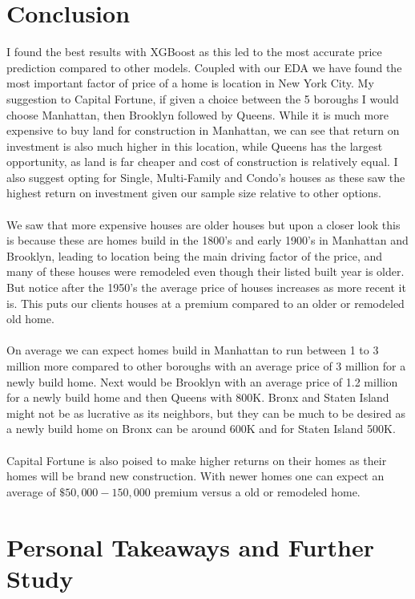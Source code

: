 \documentclass{article}
\begin{document}
\begin{titlepage}
\section{Conclusion}
I found the best results with XGBoost as this led to the most accurate price prediction compared to other models. Coupled with our EDA we have found the most important factor of price of a home is location in New York City. My suggestion to Capital Fortune, if given a choice between the 5 boroughs I would choose Manhattan, then Brooklyn followed by Queens. While it is much more expensive to buy land for construction in Manhattan, we can see that return on investment is also much higher in this location, while Queens has the largest opportunity, as land is far cheaper and cost of construction is relatively equal. I also suggest opting for Single, Multi-Family and Condo's houses as these saw the highest return on investment given our sample size relative to other options.\\
\\
We saw that more expensive houses are older houses but upon a closer look this is because these are homes build in the 1800's and early 1900's in Manhattan and Brooklyn, leading to location being the main driving factor of the price, and many of these houses were remodeled even though their listed built year is older. But notice after the 1950's the average price of houses increases as more recent it is. This puts our clients houses at a premium compared to an older or remodeled old home.\\
\\
On average we can expect homes build in Manhattan to run between 1 to 3 million more compared to other boroughs with an average price of 3 million for a newly build home. Next would be Brooklyn with an average price of 1.2 million for a newly build home and then Queens with 800K. Bronx and Staten Island might not be as lucrative as its neighbors, but they can be much to be desired as a newly build home on Bronx can be around 600K and for Staten Island 500K. \\
\\
Capital Fortune is also poised to make higher returns on their homes as their homes will be brand new construction. With newer homes one can expect an average of $\$50,000-150,000$ premium versus a old or remodeled home.

\section{Personal Takeaways and Further Study}


\end{titlepage}
\end{document}
